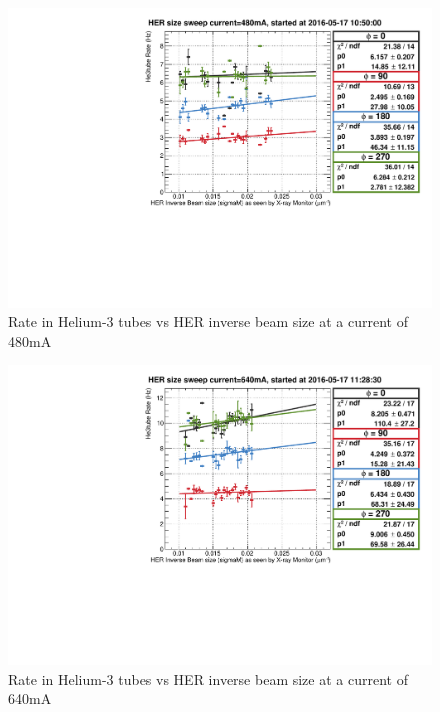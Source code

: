 \begin{figure}[htb]
	\centerfloat
		\includegraphics[trim={0 0 0 0.75cm},clip, scale=0.6]{images/2008}
	\caption{Rate in Helium-3 tubes vs HER inverse beam size at a current of 480mA}	
	\label{fig:TousHER2008}
\end{figure}

\begin{figure}[htb]
	\centerfloat
		\includegraphics[trim={0 0 0 0.75cm},clip, scale=0.6]{images/2009}
	\caption{Rate in Helium-3 tubes vs HER inverse beam size at a current of 640mA}	
	\label{fig:TousHER2009}
\end{figure}

